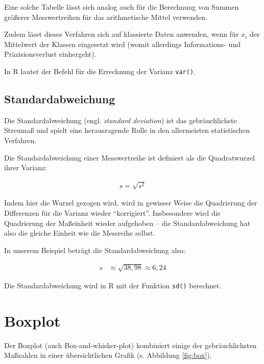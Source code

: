 \documentclass[
  11pt,
  ngerman,
  a4paper,
]{report}
\newenvironment{rtip}{
  \medskip
  \begin{tcolorbox}[colframe=purple,colback=light_gray,title=Softwarehinweis]
}{
  \end{tcolorbox}
  \medskip
}
\begin{document}
Eine solche Tabelle lässt sich analog auch für die Berechnung von Summen größerer Messwertreihen für das arithmetische Mittel verwenden.

Zudem lässt dieses Verfahren sich auf klassierte Daten anwenden, wenn für \(x_i\) der Mittelwert der Klassen eingesetzt wird (womit allerdings Informations- und Präzisionsverlust einhergeht).

\begin{rtip}
In R lautet der Befehl für die Errechnung der Varianz \verb|var()|.
\end{rtip}

\hypertarget{standardabweichung}{%
\subsection{Standardabweichung}\label{standardabweichung}}

Die Standardabweichung (engl. \emph{standard deviation}) ist das gebräuchlichste Streumaß und spielt eine herausragende Rolle in den allermeisten statistischen Verfahren.

Die Standardabweichung einer Messwertreihe ist definiert als die Quadratwurzel ihrer Varianz:

\[
  \begin{aligned}
    s=\sqrt{s^2}
  \end{aligned}
  \label{eq:sd}
\]

Indem hier die Wurzel gezogen wird, wird in gewisser Weise die Quadrierung der Differenzen für die Varianz wieder \enquote{korrigiert}. Insbesondere wird die Quadrierung der Maßeinheit wieder aufgehoben -- die Standardabweichung hat also die gleiche Einheit wie die Messreihe selbst.

In unserem Beispiel beträgt die Standardabweichung also:

\[
  \begin{aligned}
    s&\approx\sqrt{38{,}98}
      \approx6{,}24
  \end{aligned}
\]

\begin{rtip}
Die Standardabweichung wird in R mit der Funktion \verb|sd()| berechnet.
\end{rtip}

\hypertarget{boxplot}{%
\section{Boxplot}\label{boxplot}}

Der Boxplot (auch Box-and-whisker-plot) kombiniert einige der gebräuchlichsten Maßzahlen in einer übersichtlichen Grafik (s. Abbildung \ref{fig:box}).
\end{document}
